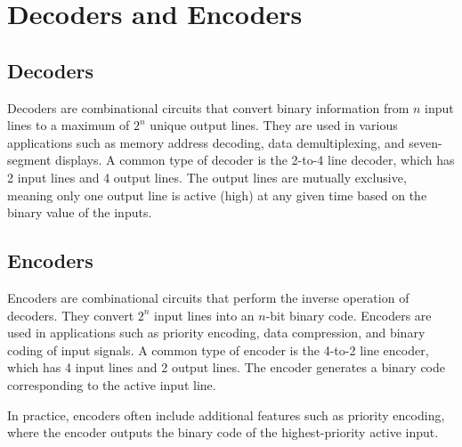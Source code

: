 \section{Decoders and Encoders}

\subsection{Decoders}
Decoders are combinational circuits that
convert binary information from $n$ input
lines to a maximum of $2^n$ unique output lines.
They are used in various applications such as
memory address decoding, data demultiplexing,
and seven-segment displays. A common
type of decoder is the 2-to-4 line decoder,
which has 2 input lines and 4 output lines.
The output lines are mutually exclusive,
meaning only one output line is active (high)
at any given time based on the binary value of
the inputs.

\subsection{Encoders}
Encoders are combinational circuits that perform
the inverse operation of decoders. They convert
$2^n$ input lines into an $n$-bit binary code.
Encoders are used in applications such as priority
encoding, data compression, and binary coding of
input signals. A common type of encoder is the 4-to-2
line encoder, which has 4 input lines and 2 output
lines. The encoder generates a binary code corresponding
to the active input line.

In practice, encoders often include additional
features such as priority encoding, where the
encoder outputs the binary code of the
highest-priority active input.